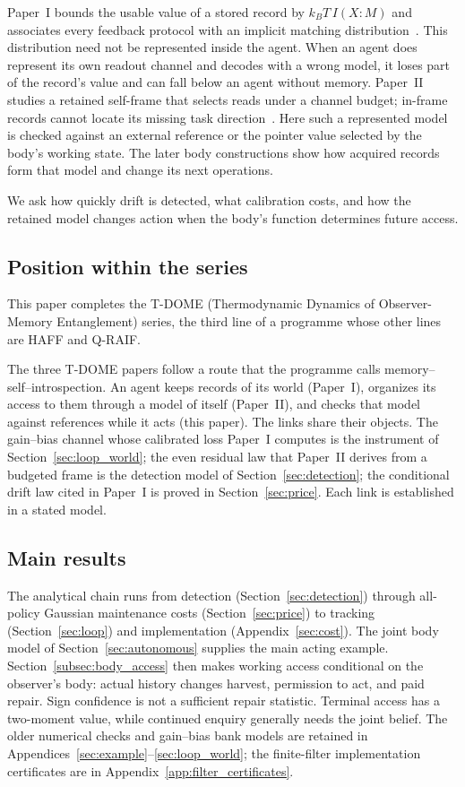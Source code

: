 \documentclass[12pt]{article}
\theoremstyle{definition}
\begin{document}
Paper~I bounds the usable value of a stored record by $k_BT\,I(X{:}M)$ and associates every feedback protocol with an implicit matching distribution~\cite{Liu2026TDOME_I}. This distribution need not be represented inside the agent. When an agent does represent its own readout channel and decodes with a wrong model, it loses part of the record's value and can fall below an agent without memory. Paper~II studies a retained self-frame that selects reads under a channel budget; in-frame records cannot locate its missing task direction~\cite{Liu2026TDOME_II}. Here such a represented model is checked against an external reference or the pointer value selected by the body's working state. The later body constructions show how acquired records form that model and change its next operations.

We ask how quickly drift is detected, what calibration costs, and how the retained model changes action when the body's function determines future access.

\subsection{Position within the series}
\label{subsec:sequence}

This paper completes the T-DOME (Thermodynamic Dynamics of Observer-Memory Entanglement) series, the third line of a programme whose other lines are HAFF and Q-RAIF.



The three T-DOME papers follow a route that the programme calls memory--self--\allowbreak introspection. An agent keeps records of its world (Paper~I), organizes its access to them through a model of itself (Paper~II), and checks that model against references while it acts (this paper). The links share their objects. The gain--bias channel whose calibrated loss Paper~I computes is the instrument of Section~\ref{sec:loop_world}; the even residual law that Paper~II derives from a budgeted frame is the detection model of Section~\ref{sec:detection}; the conditional drift law cited in Paper~I is proved in Section~\ref{sec:price}. Each link is established in a stated model.

\subsection{Main results}
\label{subsec:results}

The analytical chain runs from detection (Section~\ref{sec:detection})
through all-policy Gaussian maintenance costs (Section~\ref{sec:price})
to tracking (Section~\ref{sec:loop}) and implementation
(Appendix~\ref{sec:cost}).
The joint body model of Section~\ref{sec:autonomous} supplies the main
acting example. Section~\ref{subsec:body_access} then makes working
access conditional on the observer's body: actual history changes
harvest, permission to act, and paid repair. Sign confidence is not
a sufficient repair statistic. Terminal access has a two-moment
value, while continued enquiry generally needs the joint belief.
The older numerical checks and gain--bias bank models are retained
in Appendices~\ref{sec:example}--\ref{sec:loop_world}; the finite-filter
implementation certificates are in Appendix~\ref{app:filter_certificates}.
\end{document}
